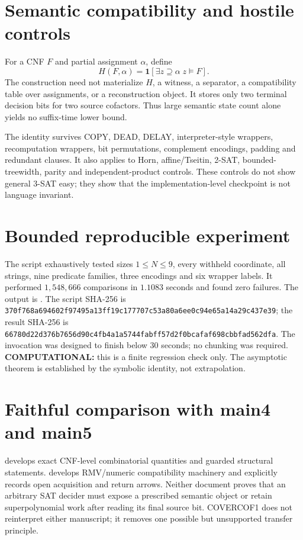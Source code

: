 \documentclass[11pt]{article}
\newcommand{\Status}[1]{\textbf{#1}}
\begin{document}
\section{Semantic compatibility and hostile controls}
For a CNF \(F\) and partial assignment \(\alpha\), define
\[
 H(F,\alpha)=\mathbf 1\!\left[\exists z\supseteq\alpha\; z\models F\right].
\]
The construction need not materialize \(H\), a witness, a separator, a
compatibility table over assignments, or a reconstruction object. It stores
only two terminal decision bits for two source cofactors. Thus large semantic
state count alone yields no suffix-time lower bound.

The identity survives COPY, DEAD, DELAY, interpreter-style wrappers,
recomputation wrappers, bit permutations, complement encodings, padding and
redundant clauses. It also applies to Horn, affine/Tseitin, 2-SAT,
bounded-treewidth, parity and independent-product controls. These controls do
not show general 3-SAT easy; they show that the implementation-level checkpoint
is not language invariant.

\section{Bounded reproducible experiment}
The script 
exhaustively tested sizes \(1\le N\le9\), every withheld coordinate, all
strings, nine predicate families, three encodings and six wrapper labels. It
performed \(1{,}548{,}666\) comparisons in \(1.1083\) seconds and found zero
failures. The output is
.
The script SHA-256 is
\texttt{370f768a694602f97495a13ff19c177707c53a80a6ee0c94e65a14a29c437e39};
the result SHA-256 is
\texttt{66780d22d376b7656d90c4fb4a1a5744fabff57d2f0bcafaf698cbbfad562dfa}.
The invocation was designed to finish below 30 seconds; no chunking was
required. \Status{COMPUTATIONAL:} this is a finite regression check only. The
asymptotic theorem is established by the symbolic identity, not extrapolation.

\section{Faithful comparison with main4 and main5}
 develops exact CNF-level combinatorial quantities and guarded
structural statements.  develops RMV/numeric compatibility
machinery and explicitly records open acquisition and return arrows. Neither
document proves that an arbitrary SAT decider must expose a prescribed
semantic object or retain superpolynomial work after reading its final source
bit. COVERCOF1 does not reinterpret either manuscript; it removes one possible
but unsupported transfer principle.
\end{document}
